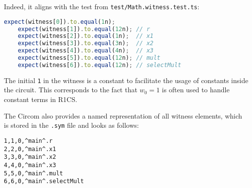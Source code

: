 \documentclass[../lecture-notes.tex]{subfiles}
\begin{document}
    Indeed, it aligns with the test from \texttt{test/Math.witness.test.ts}:

    \begin{center}
        \begin{tcolorbox}[enhanced,
            width=0.75\textwidth,
            title={\textbf{test/Math.witness.test.ts}},
            coltitle=gray!25!black,
            attach boxed title to top center={yshift=-2mm,yshifttext=-1mm},
            boxed title style={size=small,colframe=gray!75!black,
            colback=Green!30!white,boxrule=1pt},
            top=-0.3cm,
            bottom=-0.3cm]
            \begin{lstlisting}[language=TypeScript,numbers=none,basicstyle=\ttfamily\footnotesize]
    expect(witness[0]).to.equal(1n);
    expect(witness[1]).to.equal(12n); // r
    expect(witness[2]).to.equal(1n);  // x1
    expect(witness[3]).to.equal(3n);  // x2
    expect(witness[4]).to.equal(4n);  // x3
    expect(witness[5]).to.equal(12n); // mult
    expect(witness[6]).to.equal(12n); // selectMult
            \end{lstlisting}
        \end{tcolorbox}
    \end{center}

    The initial \texttt{1} in the witness is a constant to facilitate the usage of constants inside the circuit.
    This corresponds to the fact that $w_0=1$ is often used to handle constant terms in R1CS.

    The Circom also provides a named representation of all witness elements, which is stored in the \texttt{.sym} file and looks as follows:

    \begin{center}
        \begin{tcolorbox}[enhanced,
            width=0.5\textwidth,
            title=\textbf{.sym file for $x_1? \; x_2 \times x_3: x_2+x_3$},
            coltitle=gray!25!black,
            attach boxed title to top center={yshift=-2mm,yshifttext=-1mm},
            boxed title style={size=small,colframe=gray!75!black,
            colback=blue!30!white,boxrule=1pt},
            top=-0.35cm,
            bottom=-0.35cm]
            \begin{lstlisting}[language=Circom,numbers=none,basicstyle=\ttfamily\footnotesize,escapechar=^]
1,1,0,^main^.r
2,2,0,^main^.x1
3,3,0,^main^.x2
4,4,0,^main^.x3
5,5,0,^main^.mult
6,6,0,^main^.selectMult
            \end{lstlisting}
        \end{tcolorbox}
    \end{center}
\end{document}
